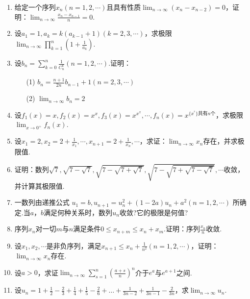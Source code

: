 \begin{enumerate}
	\item 给定一个序列${x_{n}(n=1,2,\cdots)}$且具有性质$\lim _ { n \rightarrow \infty } \left( x _ { n } - x _ { n - 2 } \right) = 0$，证明：$\lim _ { n \rightarrow \infty } \frac { x _ { n } - x _ { n - 1 } } { n } = 0$.
	\item 设$a _ { 1 } = 1 , a _ { k } = k \left( a _ { k - 1 } + 1 \right) ( k = 2,3 , \cdots )$，求极限$\lim _ { n \rightarrow \infty } \prod _ { k = 1 } ^ { n } \left( 1 + \frac { 1 } { a _ { k } } \right)$.
	\item 设$b _ { n } = \sum _ { k = 0 } ^ { n } \frac { 1 } { C _ { n } ^ { k } } ( n = 1,2 , \cdots )$.证明：
	\begin{enumerate}
		\item[(1)] $b _ { n } = \frac { n + 1 } { 2 n } b _ { n - 1 } + 1 ( n = 2,3 , \cdots )$
		\item[(2)] $\lim _ { n \rightarrow \infty } b _ { n } = 2$
	\end{enumerate}
\item 设$f_1\left(x\right)=x,f_2\left(x\right)=x^x,f_3\left(x\right)=x^{x^x},\cdots ,f_n\left(x\right)=x^{\{x^{^x}\}\textrm{共有}n\textrm{个}}$，求极限$\lim _ { x \rightarrow 0 ^ { + } } f _ { n } ( x )$.
\item 设$x _ { 1 } = 2 , x _ { 2 } = 2 + \frac { 1 } { x _ { 1 } } , \cdots , x _ { n + 1 } = 2 + \frac { 1 } { x _ { n } } , \cdots$，求证：$\lim_{ n \rightarrow \infty }x_{n}$存在，并求极限值.
\item 证明：数列$\sqrt { 7 } , \sqrt { 7 - \sqrt { 7 } } , \sqrt { 7 - \sqrt { 7 + \sqrt { 7 } } } , \sqrt { 7 - \sqrt { 7 + \sqrt { 7 - \sqrt { 7 } } } } ,\cdots$收敛，并计算其极限值.
\item 一数列由递推公式 $u _ { 1 } = b , u _ { n + 1 } = u _ { n } ^ { 2 } + ( 1 - 2 a ) u _ { n } + a ^ { 2 } ( n = 1,2 , \cdots )$ 所确定.当$a$，$b$满足何种关系时，数列${u_{n}}$收敛?它的极限是何值?
\item 序列${x_{n}}$对一切$m$与$n$满足条件$0 \leqslant x _ { n + m } \leqslant x _ { n } + x _ { m }$.证明：序列${\frac{{x_{n}}}{n}}$收敛.
\item 设$x _ { 1 } , x _ { 2 } , \cdots$是非负序列，满足$x _ { n + 1 } \leqslant x _ { n } + \frac { 1 } { n ^ { 2 } } ( n = 1,2 , \cdots )$，证明：$\lim _ { n \rightarrow \infty } x _ { n }$存在.
\item 设$a>0$，求证$\lim _ { n \rightarrow \infty } \sum _ { s = 1 } ^ { n } \left( \frac { a + s } { n } \right) ^ { n }$介于$e^{a}$与$e^{a+1}$之间.
\item 设$u _ { n } = 1 + \frac { 1 } { 2 } - \frac { 2 } { 3 } + \frac { 1 } { 4 } + \frac { 1 } { 5 } - \frac { 2 } { 6 } + \dots + \frac { 1 } { 3 n - 2 } + \frac { 1 } { 3 n - 1 } - \frac { 2 } { 3 n }$，求$\lim_{ n \rightarrow \infty }u_{n}$.

\end{enumerate}
